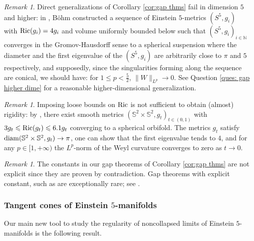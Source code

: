 \documentclass[11pt,reqno]{amsart}
\numberwithin{equation}{section}
\newcommand{\Ric}{{\rm Ric}}
\newcommand{\diam}{{\rm diam}}
\theoremstyle{definition}
\theoremstyle{remark}
\newtheorem{remark}[thm]{Remark}
\begin{document}

\begin{remark}
    Direct generalizations of Corollary \ref{cor:gap thms} fail in dimension $5$ and higher: in \cite{boh}, Böhm constructed a sequence of Einstein $5$-metrics $(S^5,g_i)$ with $\Ric(g_i) = 4g_i$ and volume uniformly bounded below such that $(S^5,g_i)_{i\in\mathbb{N} }$ converges in the Gromov-Hausdorff sense to a spherical suspension where the diameter and the first eigenvalue of the $(S^5,g_i)$ are arbitrarily close to $\pi$ and $5$ respectively, and supposedly, since the singularities forming along the sequence are conical, we should have: for $1\leqslant p<\frac{5}{2}$, $\|W\|_{L^p}\to 0$. See Question \ref{ques: gap higher dime} for a reasonable higher-dimensional generalization.
\end{remark}

\begin{remark}\label{rem: counterex bounded Ricci}
    Imposing loose bounds on $\Ric$ is not sufficient to obtain (almost) rigidity: by \cite[Remark 51]{ozu2}, there exist smooth metrics $(\mathbb{S}^2\times \mathbb{S}^2,g_t)_{t\in(0,1)}$ with $3g_t\leqslant\Ric(g_t)\leqslant 6.1g_t$ converging to a spherical orbifold.
    The metrics $g_t$ satisfy $\diam(\mathbb{S}^2\times \mathbb{S}^2,g_t) \to \pi$, one can show that the first eigenvalue tends to $4$, and for any $p\in [1,+\infty) $ the $L^p$-norm of the Weyl curvature converges to zero as $t\to 0$. 
\end{remark}

\begin{remark}
    The constants in our gap theorems of Corollary \ref{cor:gap thms} are not explicit since they are proven by contradiction. Gap theorems with explicit constant, such as \cite{gur00} are exceptionally rare; see \cite{aes}. 
\end{remark}

\subsubsection{Tangent cones of Einstein $5$-manifolds}

Our main new tool to study the regularity of noncollapsed limits of Einstein $5$-manifolds is the following result. 
\end{document}
